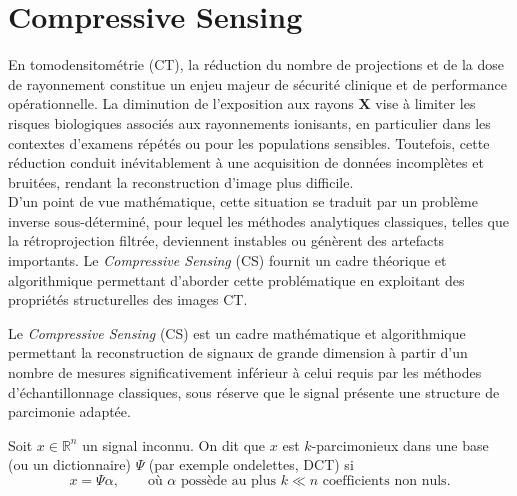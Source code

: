 \section{Compressive Sensing}

En tomodensitométrie (CT), la réduction du nombre de projections et de la dose de rayonnement \cite{15}
constitue un enjeu majeur de sécurité clinique et de performance opérationnelle. La diminution
de l'exposition aux rayons $\mathbf{X}$ vise à limiter les risques biologiques associés aux
rayonnements ionisants, en particulier dans les contextes d'examens répétés ou pour les
populations sensibles. Toutefois, cette réduction conduit inévitablement à une acquisition
de données incomplètes et bruitées, rendant la reconstruction d'image plus difficile.\\
D'un point de vue mathématique, cette situation se traduit par un problème inverse
sous-déterminé, pour lequel les méthodes analytiques classiques, telles que la
rétroprojection filtrée, deviennent instables ou génèrent des artefacts importants.
Le \emph{Compressive Sensing} (CS) fournit un cadre théorique et algorithmique permettant
d'aborder cette problématique en exploitant des propriétés structurelles des images CT.

\begin{definition}
    Le \emph{Compressive Sensing} (CS) est un cadre mathématique et algorithmique permettant la
    reconstruction de signaux de grande dimension à partir d'un nombre de mesures
    significativement inférieur à celui requis par les méthodes d'échantillonnage classiques,
    sous réserve que le signal présente une structure de parcimonie adaptée.
\end{definition}

\begin{definition}
    Soit $x \in \mathbb{R}^{n}$ un signal inconnu. On dit que $x$ est
    \(k\)-parcimonieux dans une base (ou un dictionnaire) \(\Psi\)
    (par exemple ondelettes, DCT) si
    \begin{equation}
        x = \Psi \alpha, \qquad \text{où } \alpha \text{ possède au plus } k \ll n
        \text{ coefficients non nuls}.
    \end{equation}
\end{definition}

